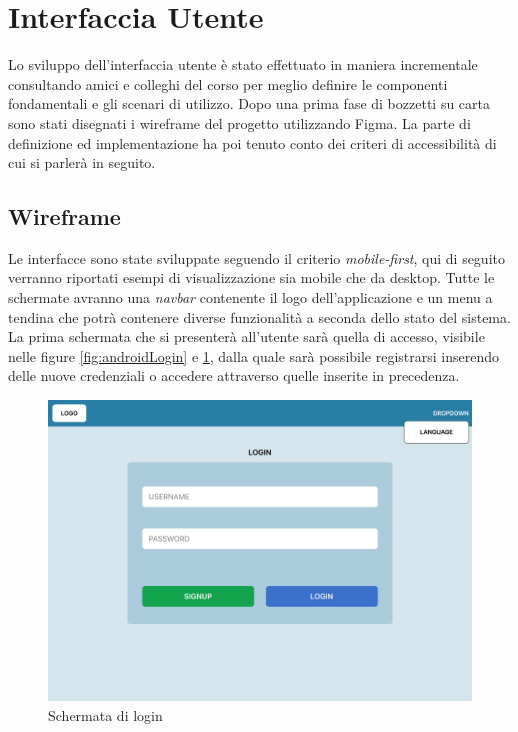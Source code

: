 \newpage

\section{Interfaccia Utente}
Lo sviluppo dell'interfaccia utente è stato effettuato in maniera incrementale consultando amici e colleghi del corso per meglio definire le componenti fondamentali e gli scenari di utilizzo. Dopo una prima fase di bozzetti su carta sono stati disegnati i wireframe del progetto utilizzando Figma. La parte di definizione ed implementazione ha poi tenuto conto dei criteri di accessibilità di cui si parlerà in seguito.

\subsection{Wireframe}
Le interfacce sono state sviluppate seguendo il criterio \emph{mobile-first}, qui di seguito verranno riportati esempi di visualizzazione sia mobile che da desktop. Tutte le schermate avranno una \emph{navbar} contenente il logo dell'applicazione e un menu a tendina che potrà contenere diverse funzionalità a seconda dello stato del sistema.\\

La prima schermata che si presenterà all'utente sarà quella di accesso, visibile nelle figure \ref{fig:androidLogin} e \ref{fig:pcLogin}, dalla quale sarà possibile registrarsi inserendo delle nuove credenziali o accedere attraverso quelle inserite in precedenza.



\begin{figure}[H]
\centering
\includegraphics[width=\textwidth]{img/figma/Wireframe-1.png}
\caption{Schermata di login}
\label{fig:pcLogin}
\end{figure}


